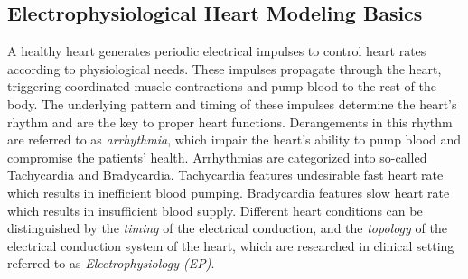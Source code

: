\subsection{Electrophysiological Heart Modeling Basics}
A healthy heart generates periodic electrical impulses to control heart rates according to physiological needs. 
These impulses propagate through the heart, triggering coordinated muscle contractions and pump blood to the rest of the body. 
The underlying pattern and timing of these impulses determine the heart's rhythm and are the key to proper heart functions. 
Derangements in this rhythm are referred to as \emph{arrhythmia}, which impair the heart's ability to pump blood and compromise the patients' health. 
Arrhythmias are categorized into so-called Tachycardia and Bradycardia. 
Tachycardia features undesirable fast heart rate which results in inefficient blood pumping. Bradycardia features slow heart rate which results in insufficient blood supply. Different heart conditions can be distinguished by the \emph{timing} of the electrical conduction, and the \emph{topology} of the electrical conduction system of the heart, which are researched in clinical setting referred to as \emph{Electrophysiology (EP)}\cite{josephson}. 



